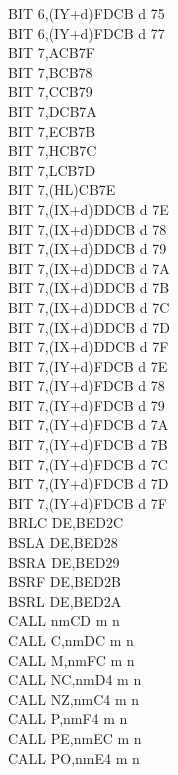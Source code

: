 \begin{multicols}{3}
{\begin{tabbing}
		BIT 6,(IY+d)\UNDOC\>FDCB d 75\\
		BIT 6,(IY+d)\UNDOC\>FDCB d 77\\
		BIT 7,A\>CB7F\\
		BIT 7,B\>CB78\\
		BIT 7,C\>CB79\\
		BIT 7,D\>CB7A\\
		BIT 7,E\>CB7B\\
		BIT 7,H\>CB7C\\
		BIT 7,L\>CB7D\\
		BIT 7,(HL)\>CB7E\\
		BIT 7,(IX+d)\>DDCB d 7E\\
		BIT 7,(IX+d)\UNDOC\>DDCB d 78\\
		BIT 7,(IX+d)\UNDOC\>DDCB d 79\\
		BIT 7,(IX+d)\UNDOC\>DDCB d 7A\\
		BIT 7,(IX+d)\UNDOC\>DDCB d 7B\\
		BIT 7,(IX+d)\UNDOC\>DDCB d 7C\\
		BIT 7,(IX+d)\UNDOC\>DDCB d 7D\\
		BIT 7,(IX+d)\UNDOC\>DDCB d 7F\\
		BIT 7,(IY+d)\>FDCB d 7E\\
		BIT 7,(IY+d)\UNDOC\>FDCB d 78\\
		BIT 7,(IY+d)\UNDOC\>FDCB d 79\\
		BIT 7,(IY+d)\UNDOC\>FDCB d 7A\\
		BIT 7,(IY+d)\UNDOC\>FDCB d 7B\\
		BIT 7,(IY+d)\UNDOC\>FDCB d 7C\\
		BIT 7,(IY+d)\UNDOC\>FDCB d 7D\\
		BIT 7,(IY+d)\UNDOC\>FDCB d 7F\\
		BRLC DE,B\ZXN\>ED2C\\
		BSLA DE,B\ZXN\>ED28\\
		BSRA DE,B\ZXN\>ED29\\
		BSRF DE,B\ZXN\>ED2B\\
		BSRL DE,B\ZXN\>ED2A\\
		CALL nm\>CD m n\\
		CALL C,nm\>DC m n\\
		CALL M,nm\>FC m n\\
		CALL NC,nm\>D4 m n\\
		CALL NZ,nm\>C4 m n\\
		CALL P,nm\>F4 m n\\
		CALL PE,nm\>EC m n\\
		CALL PO,nm\>E4 m n\\

\end{tabbing}}
\end{multicols}
